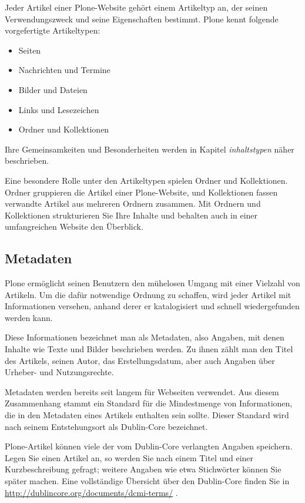 \documentclass[a4paper,12pt,ngerman]{manual}
\begin{document}
Jeder Artikel einer Plone-Website gehört einem Artikeltyp an, der seinen
Verwendungszweck und seine Eigenschaften bestimmt. Plone kennt folgende
vorgefertigte Artikeltypen:
\begin{itemize}
\item {} 
Seiten

\item {} 
Nachrichten und Termine

\item {} 
Bilder und Dateien

\item {} 
Links und Lesezeichen

\item {} 
Ordner und Kollektionen

\end{itemize}

Ihre Gemeinsamkeiten und Besonderheiten werden in
Kapitel \emph{inhaltstypen} näher beschrieben.

Eine besondere Rolle unter den Artikeltypen
spielen Ordner und Kollektionen. Ordner gruppieren die Artikel einer
Plone-Website, und Kollektionen fassen verwandte Artikel aus
mehreren Ordnern zusammen. Mit Ordnern und Kollektionen strukturieren
Sie Ihre Inhalte und behalten auch in einer umfangreichen Website
den Überblick.
\hypertarget{ueberblick-metadaten}{}

\subsection{Metadaten}

Plone ermöglicht seinen Benutzern den mühelosen Umgang mit einer Vielzahl von
Artikeln. Um die dafür notwendige Ordnung zu schaffen, wird jeder Artikel mit
Informationen versehen, anhand derer er katalogisiert und schnell
wiedergefunden werden kann.

Diese Informationen bezeichnet man als Metadaten, also Angaben, mit denen
Inhalte wie Texte und Bilder beschrieben werden. Zu ihnen zählt man den Titel
des Artikels, seinen Autor, das Erstellungsdatum, aber auch Angaben über
Urheber- und Nutzungsrechte.

Metadaten werden bereits seit langem für Webseiten verwendet. Aus diesem
Zusammenhang stammt ein Standard für die Mindestmenge von Informationen, die
in den Metadaten eines Artikels enthalten sein sollte. Dieser Standard wird
nach seinem Entstehungsort als Dublin-Core bezeichnet.

Plone-Artikel können viele der vom Dublin-Core verlangten Angaben
speichern. Legen Sie einen Artikel an, so werden Sie nach einem Titel
und einer Kurzbeschreibung gefragt; weitere Angaben wie etwa
Stichwörter können Sie später machen. Eine vollständige Übersicht
über den Dublin-Core finden Sie in
\href{http://dublincore.org/documents/dcmi-terms/}{http://dublincore.org/documents/dcmi-terms/} .
\end{document}
